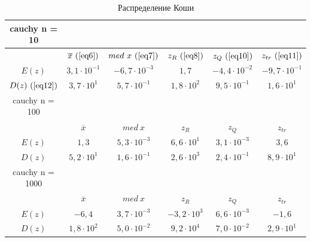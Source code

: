 \begin{table}[H]
    \centering
    \begin{tabular}{ |c|c|c|c|c|c| } 
 \hline
 cauchy n = 10 & & & & & \\ 
 \hline
  &$\overline{x}\ (\ref{eq6})$ & $med\ x\ (\ref{eq7})$ & $z_{R}\ (\ref{eq8})$ & $z_{Q}\ (\ref{eq10})$ & $z_{tr}\ (\ref{eq11})$\\ 
 \hline
 $E(z)$ & $3,1 \cdot 10^{-1}$ & $-6,7 \cdot 10^{-3}$ & $ 1,7 $ & $ -4,4 \cdot 10^{-2}$ & $-9,7 \cdot 10^{-1}$ \\ 
 \hline
 $D(z)\ (\ref{eq12})$ & $3,7 \cdot 10^{1}$ & $5,7 \cdot 10^{-1}$ & $1,8 \cdot 10^{2}$ & $9,5 \cdot 10^{-1}$ & $1,6 \cdot 10^{1}$ \\ 
 \hline\hline
 cauchy n = 100 & & & & & \\
 \hline
 &$\overline{x}$ & $med\ x$ & $z_{R}$ & $z_{Q}$ & $z_{tr}$\\ 
 \hline
 $E(z)$ & $1,3$ & $5,3 \cdot 10^{-3}$ & $6,6 \cdot 10^{1}$ & $3,1 \cdot 10^{-3}$ & $3,6$ \\ 
 \hline
 $D(z)$ & $5,2 \cdot 10^{1}$ & $1,6 \cdot 10^{-1}$ & $2,6 \cdot 10^{3}$ & $2,4 \cdot 10^{-1}$ & $8,9 \cdot 10^{1}$ \\ 
 \hline\hline
 cauchy n = 1000 & & & & & \\
 \hline
 &$\overline{x}$ & $med\ x$ & $z_{R}$ & $z_{Q}$ & $z_{tr}$\\ 
 \hline
 $E(z)$ & $-6,4$ & $3,7\cdot 10^{-3}$ & $-3,2 \cdot 10^{3}$ & $6,6 \cdot 10^{-3}$ & $-1,6$ \\ 
 \hline
 $D(z)$ & $1,8 \cdot 10^{2}$ & $5,0 \cdot 10^{-2}$ & $9,2 \cdot 10^{4}$ & $7,0 \cdot 10^{-2}$ & $2,9 \cdot 10^{1}$ \\
 \hline
\end{tabular}
    \caption{Распределение Коши}
    \label{table:2}
\end{table}


